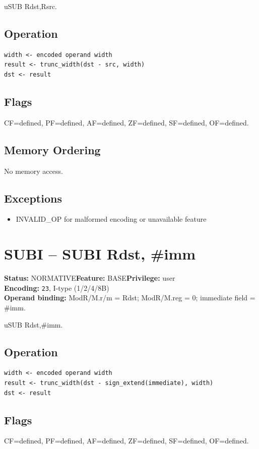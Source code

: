 \documentclass[10pt]{article}
\begin{document}
uSUB Rdst,Rsrc.

\subsection*{Operation}
\begin{lstlisting}
width <- encoded operand width
result <- trunc_width(dst - src, width)
dst <- result
\end{lstlisting}
\subsection*{Flags}
CF=defined, PF=defined, AF=defined, ZF=defined, SF=defined, OF=defined.
\subsection*{Memory Ordering}
No memory access.
\subsection*{Exceptions}
\begin{itemize}
\item INVALID\_OP for malformed encoding or unavailable feature
\end{itemize}
\clearpage

\section{SUBI -- SUBI Rdst, \#imm}
\textbf{Status:} NORMATIVE\quad \textbf{Feature:} BASE\quad \textbf{Privilege:} user\\
\textbf{Encoding:} \texttt{23}, I-type (1/2/4/8B)\\
\textbf{Operand binding:} ModR/M.r/m = Rdst; ModR/M.reg = 0; immediate field = \#imm.

uSUB Rdst,\#imm.

\subsection*{Operation}
\begin{lstlisting}
width <- encoded operand width
result <- trunc_width(dst - sign_extend(immediate), width)
dst <- result
\end{lstlisting}
\subsection*{Flags}
CF=defined, PF=defined, AF=defined, ZF=defined, SF=defined, OF=defined.
\end{document}
